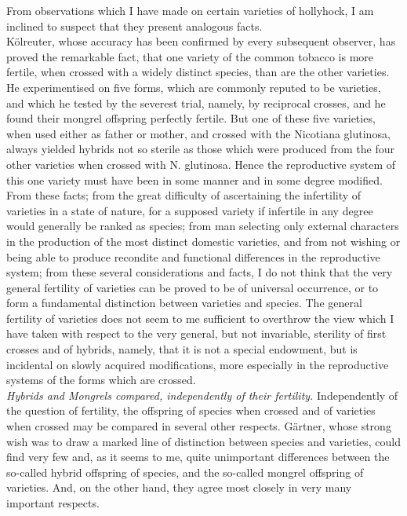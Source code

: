 \indent From observations which I have made on certain varieties of hollyhock, I am inclined to suspect that they present analogous facts.\\
\indent K\"{o}lreuter, whose accuracy has been confirmed by every subsequent observer, has proved the remarkable fact, that one variety of the common tobacco is more fertile, when crossed with a widely distinct species, than are the other varieties. He experimentised on five forms, which are commonly reputed to be varieties, and which he tested by the severest trial, namely, by reciprocal crosses, and he found their mongrel offspring perfectly fertile. But one of these five varieties, when used either as father or mother, and crossed with the Nicotiana glutinosa, always yielded hybrids not so sterile as those which were produced from the four other varieties when crossed with N. glutinosa. Hence the reproductive system of this one variety must have been in some manner and in some degree modified.\\
\indent From these facts; from the great difficulty of ascertaining the infertility of varieties in a state of nature, for a supposed variety if infertile in any degree would generally be ranked as species; from man selecting only external characters in the production of the most distinct domestic varieties, and from not wishing or being able to produce recondite and functional differences in the reproductive system; from these several considerations and facts, I do not think that the very general fertility of varieties can be proved to be of universal occurrence, or to form a fundamental distinction between varieties and species. The general fertility of varieties does not seem to me sufficient to overthrow the view which I have taken with respect to the very general, but not invariable, sterility of first crosses and of hybrids, namely, that it is not a special endowment, but is incidental on slowly acquired modifications, more especially in the reproductive systems of the forms which are crossed.\\
\indent \emph{Hybrids and Mongrels compared, independently of their fertility.} Independently of the question of fertility, the offspring of species when crossed and of varieties when crossed may be compared in several other respects. G\"{a}rtner, whose strong wish was to draw a marked line of distinction between species and varieties, could find very few and, as it seems to me, quite unimportant differences between the so-called hybrid offspring of species, and the so-called mongrel offspring of varieties. And, on the other hand, they agree most closely in very many important respects.\\
